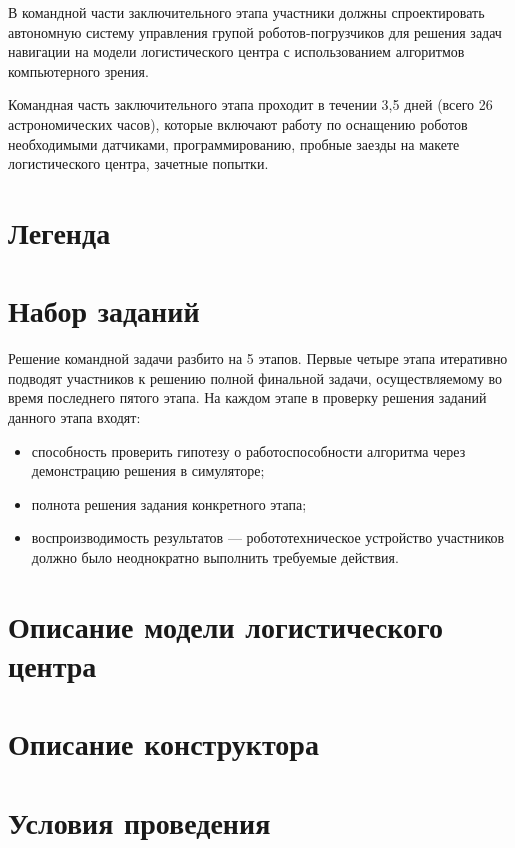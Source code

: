 В командной части заключительного этапа участники должны
спроектировать автономную систему управления групой роботов-погрузчиков
для решения задач навигации на модели логистического центра с
использованием алгоритмов компьютерного зрения.

Командная часть заключительного этапа проходит в течении
3,5 дней (всего 26 астрономических часов), которые включают работу по
оснащению роботов необходимыми датчиками, программированию, пробные заезды
на макете логистического центра, зачетные попытки.

\section{Легенда}


\section{Набор заданий}

Решение командной задачи разбито на 5 этапов. Первые четыре
этапа итеративно подводят участников к решению полной финальной
задачи, осуществляемому во время последнего пятого этапа. На
каждом этапе в проверку решения заданий данного этапа входят:
\begin{itemize}
    \item способность проверить гипотезу о работоспособности алгоритма
    через демонстрацию решения в симуляторе;
    \item полнота решения задания конкретного этапа;
    \item воспроизводимость результатов --- робототехническое
    устройство участников должно было неоднократно выполнить требуемые
    действия.
\end{itemize}



\section{Описание модели логистического центра}


\section{Описание конструктора}


\section{Условия проведения}


